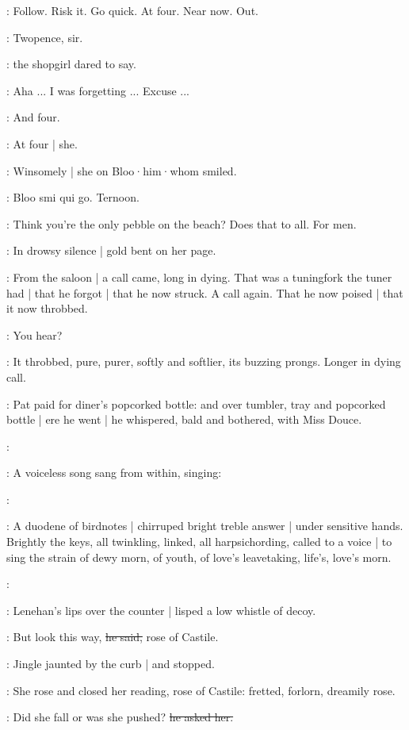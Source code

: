 \BloomInt:
Follow.
Risk it.
Go quick.
At four.
Near now.
Out.

\shopgirl:
Twopence,
sir.

:
the shopgirl dared to say.

\Bloom:
Aha ...
I was forgetting ...
Excuse ...

\shopgirl:
And four.

\BloomInt:
At four |
she.

:
Winsomely |
she on Bloo·him·whom smiled.

:
Bloo smi qui go.
Ternoon.

\BloomInt:
Think you're the only pebble on the beach?
Does that to all.
For men.

:
In drowsy silence |
gold bent on her page.

:
From the saloon |
a call came,
long in dying.
That was a tuningfork the tuner had |
that he forgot |
that he now struck.
A call again.
That he now poised |
that it now throbbed.

\simon:
You hear?

:
It throbbed,
pure,
purer,
softly and softlier,
its buzzing prongs.
Longer in dying call.

:
Pat paid for diner's popcorked bottle:
and over tumbler, tray and popcorked bottle |
ere he went |
he whispered,
bald and bothered,
with Miss Douce.

\simon:

:
A voiceless song sang from within,
singing:

\simon:

:
A duodene of birdnotes |
chirruped bright treble answer |
under sensitive hands.
Brightly the keys,
all twinkling,
linked,
all harpsichording,
called to a voice |
to sing the strain of dewy morn,
of youth,
of love's leavetaking,
life's,
love's morn.

\simon:

:
Lenehan's lips over the counter |
lisped a low whistle of decoy.

\lenehan:
But look this way,
\sout{he said,}
rose of Castile.

:
Jingle jaunted by the curb |
and stopped.

:
She rose and closed her reading,
rose of Castile:
fretted,
forlorn,
dreamily rose.

\lenehan:
Did she fall or was she pushed?
\sout{he asked her.}

